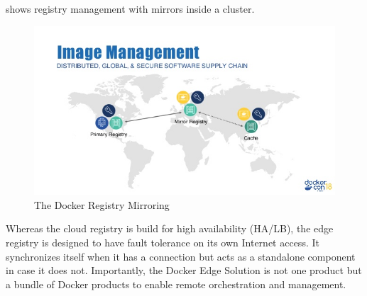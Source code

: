  shows registry management with mirrors inside a cluster.
\begin{figure}[!ht]
    \centering
    \includegraphics[width=\textwidth]{figures/docker-edge-computing-with-docker-enterprise.jpg}
    \caption{The Docker Registry Mirroring}
    \label{fig:dockerRegistryForIoT}
\end{figure}
Whereas the cloud registry is build for high availability (HA/LB), the edge registry is designed to have fault tolerance on its own Internet access. It synchronizes itself when it has a connection but acts as a standalone component in case it does not.
Importantly, the Docker Edge Solution is not one product but a bundle of Docker products to enable remote orchestration and management.

